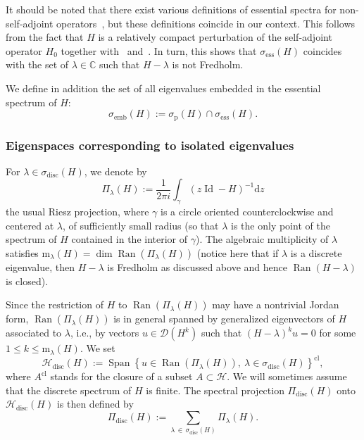 \documentclass[10pt]{amsart}
\theoremstyle{definition}\newtheorem{defi}[theo]{Definition}\newtheorem{rema}[theo]{Remark}\newtheorem{exam}[theo]{Example}\newtheorem{exem}[theo]{Example}\newtheorem{nota}[theo]{Notation}
\newcommand{\Hi}{\mathcal{H}}
\newcommand{\bbC}{\mathbb{C}}
\newcommand{\ess}{\mathrm{ess}}
\newcommand{\rmp}{\mathrm{p}}
\newcommand{\rmd}{\mathrm{d}}
\newcommand{\rmm}{\mathrm{m}}
\newcommand{\disc}{\mathrm{disc}}
\newcommand{\clD}{\mathcal{D}}
\DeclareMathOperator{\Ran}{Ran}
\DeclareMathOperator{\Id}{Id}
\DeclareMathOperator{\Span}{Span}
\begin{document}
It should be noted that there exist various definitions of essential spectra for non-self-adjoint operators~\cite[Chapter~IX]{EdEv87_01}, but these definitions coincide in our context. This follows from the fact that $H$ is a relatively compact perturbation of the self-adjoint operator $H_0$ together with~\cite[Corollary~2 of Theorem~XIII.14]{ReSi80_01} and~\cite[Theorems~IX.1.6 and IX.2.1]{EdEv87_01}. In turn, this shows that $\sigma_{\ess}(H)$ coincides with the set of $\lambda\in\bbC$ such that $H-\lambda$ is not Fredholm.

We define in addition the set of all eigenvalues embedded in the essential spectrum of $H$:
\begin{equation*}
\sigma_{\mathrm{emb}}(H):=\sigma_{\rmp}(H)\cap\sigma_{\ess}(H).
\end{equation*}



\subsubsection{Eigenspaces corresponding to isolated eigenvalues}\label{subsubsec:isolated}

For $\lambda\in\sigma_\disc(H)$, we denote by
\begin{equation}\label{eq:Projection_de_Riesz_def_pour_H}
\Pi_\lambda(H):=\frac{1}{2\pi i}\int_\gamma \left(z\Id-H\right)^{-1}\rmd z
\end{equation}
the usual Riesz projection, where $\gamma$ is a circle oriented counterclockwise and centered at $\lambda$, of sufficiently small radius (so that $\lambda$ is the only point of the spectrum of $H$ contained in the interior of $\gamma$). The algebraic multiplicity of $\lambda$ satisfies $\rmm_\lambda(H)=\dim\Ran(\Pi_\lambda(H))$ (notice here that if $\lambda$ is a discrete eigenvalue, then $H-\lambda$ is Fredholm as discussed above and hence $\Ran(H-\lambda)$ is closed).

Since the restriction of $H$ to $\Ran(\Pi_\lambda(H))$ may have a nontrivial Jordan form, $\Ran(\Pi_\lambda(H))$ is in general spanned by generalized eigenvectors of $H$ associated to $\lambda$, i.e., by vectors $u\in\clD(H^k)$ such that $(H-\lambda)^{k}u=0$ for some $1\leq k\leq \rmm_\lambda(H)$. We set
\begin{equation*}
\Hi_\disc(H):=\Span\left\lbrace u\in\Ran(\Pi_\lambda(H)),~\lambda\in\sigma_\disc(H)\right\rbrace^{\mathrm{cl}},
\end{equation*}
where $A^{\mathrm{cl}}$ stands for the closure of a subset $A\subset\Hi$. We will sometimes assume that the discrete spectrum of $H$ is finite. The spectral projection $\Pi_{\disc}(H)$ onto $\Hi_\disc(H)$ is then defined by
\begin{equation}\label{eq:def_Pi_disc}
\Pi_{\disc}(H):=\sum_{\lambda\,\in\,\sigma_{\disc}(H)}\Pi_\lambda(H).
\end{equation}
\end{document}
